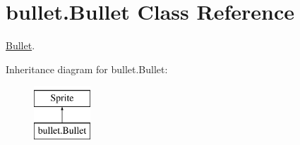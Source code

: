 \hypertarget{classbullet_1_1_bullet}{}\section{bullet.\+Bullet Class Reference}
\label{classbullet_1_1_bullet}


\mbox{\hyperlink{classbullet_1_1_bullet}{Bullet}}.  


Inheritance diagram for bullet.\+Bullet\+:\begin{figure}[H]
\begin{center}
\leavevmode
\includegraphics[height=2.000000cm]{classbullet_1_1_bullet}
\end{center}
\end{figure}
